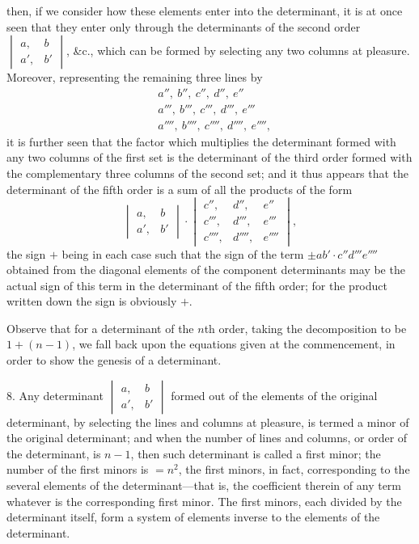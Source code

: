 \documentclass[12pt,a4paper,oneside]{book}
\begin{document}
\newpage
then, if we consider how these elements enter into the determinant, it is at once seen that they enter only through the determinants of the second order $\begin{vmatrix} a, & b \\ a', & b' \end{vmatrix}$, \&c., which can be formed by selecting any two columns at pleasure. Moreover, representing the remaining three lines by
\[
\begin{aligned}
&a'',\ b'',\ c'',\ d'',\ e''\\
&a''',\ b''',\ c''',\ d''',\ e'''\\
&a'''',\ b'''',\ c'''',\ d'''',\ e'''',
\end{aligned}
\]
it is further seen that the factor which multiplies the determinant formed with any two columns of the first set is the determinant of the third order formed with the complementary three columns of the second set; and it thus appears that the determinant of the fifth order is a sum of all the products of the form
\[
\begin{vmatrix} a, & b \\ a', & b' \end{vmatrix} \cdot \begin{vmatrix} c'', & d'', & e'' \\ c''', & d''', & e''' \\ c'''', & d'''', & e'''' \end{vmatrix},
\]
the sign $+$ being in each case such that the sign of the term $\pm ab'\cdot c''d'''e''''$ obtained from the diagonal elements of the component determinants may be the actual sign of this term in the determinant of the fifth order; for the product written down the sign is obviously $+$.

Observe that for a determinant of the $n$th order, taking the decomposition to be $1+(n-1)$, we fall back upon the equations given at the commencement, in order to show the genesis of a determinant.

8. Any determinant $\begin{vmatrix} a, & b \\ a', & b' \end{vmatrix}$ formed out of the elements of the original determinant, by selecting the lines and columns at pleasure, is termed a minor of the original determinant; and when the number of lines and columns, or order of the determinant, is $n-1$, then such determinant is called a first minor; the number of the first minors is $=n^{2}$, the first minors, in fact, corresponding to the several elements of the determinant---that is, the coefficient therein of any term whatever is the corresponding first minor. The first minors, each divided by the determinant itself, form a system of elements inverse to the elements of the determinant.
\end{document}
